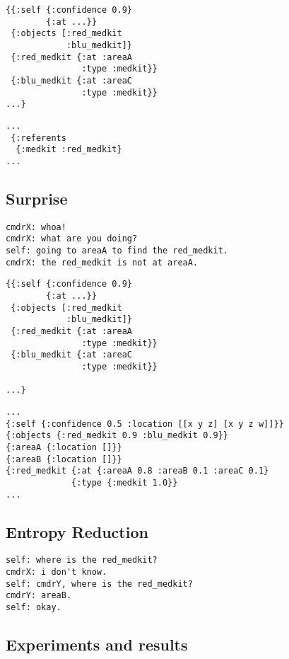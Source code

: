 \documentclass[12pt]{article}
\begin{document}
\begin{verbatim}
{{:self {:confidence 0.9}
        {:at ...}}
 {:objects [:red_medkit
            :blu_medkit]}
 {:red_medkit {:at :areaA
               :type :medkit}}
 {:blu_medkit {:at :areaC
               :type :medkit}}
...}
\end{verbatim}

\begin{verbatim}
...
 {:referents
  {:medkit :red_medkit}
...
\end{verbatim}
\subsection{Surprise}

\begin{verbatim}
cmdrX: whoa!
cmdrX: what are you doing?
self: going to areaA to find the red_medkit.
cmdrX: the red_medkit is not at areaA.
\end{verbatim}

\begin{verbatim}
{{:self {:confidence 0.9}
        {:at ...}}
 {:objects [:red_medkit
            :blu_medkit]}
 {:red_medkit {:at :areaA
               :type :medkit}}
 {:blu_medkit {:at :areaC
               :type :medkit}}

...}
\end{verbatim}

\begin{verbatim}
...
{:self {:confidence 0.5 :location [[x y z] [x y z w]]}}
{:objects {:red_medkit 0.9 :blu_medkit 0.9}}
{:areaA {:location []}}
{:areaB {:location []}}
{:red_medkit {:at {:areaA 0.8 :areaB 0.1 :areaC 0.1}
             {:type {:medkit 1.0}}
...
\end{verbatim}

\subsection{Entropy Reduction}
\begin{verbatim}
self: where is the red_medkit?
cmdrX: i don't know.
self: cmdrY, where is the red_medkit?
cmdrY: areaB.
self: okay.
\end{verbatim}

\subsection{Experiments and results}
\label{sec:experiments}
\end{document}
